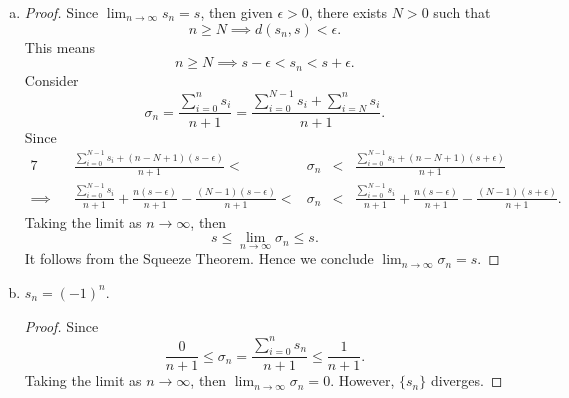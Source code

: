 \begin{Exercise}
\begin{enumerate}[(a)]
\item
\begin{proof}
Since $\lim_{n\to\infty} s_n = s$, then given $\epsilon>0$, there exists $N>0$ such that
$$
n\geq N \implies d(s_n,s) < \epsilon.
$$
This means
$$
n\geq N \implies s-\epsilon < s_n < s+\epsilon.
$$
Consider
$$
\sigma_n = \frac{\sum_{i=0}^{n} s_i}{n+1} = \frac{\sum_{i=0}^{N-1} s_i + \sum_{i=N}^{n} s_i}{n+1}.
$$
Since
\begin{alignat*}{7}
\quad&& \frac{\sum_{i=0}^{N-1}s_i + (n-N+1)(s-\epsilon)}{n+1} <& \sigma_n &<& \frac{\sum_{i=0}^{N-1}s_i + (n-N+1)(s+\epsilon)}{n+1} \\
\implies&& \frac{\sum_{i=0}^{N-1}s_i}{n+1}+\frac{n(s-\epsilon)}{n+1}-\frac{(N-1)(s-\epsilon)}{n+1} <& \sigma_n &<& \frac{\sum_{i=0}^{N-1}s_i}{n+1}+\frac{n(s-\epsilon)}{n+1}-\frac{(N-1)(s+\epsilon)}{n+1}.
\end{alignat*}
Taking the limit as $n\to\infty$, then
$$
s \leq \lim_{n\to\infty} \sigma_n \leq s.
$$
It follows from the Squeeze Theorem. Hence we conclude $\lim_{n\to\infty} \sigma_n = s$.
\end{proof}

\item
\begin{answer}
$s_n = (-1)^n$.
\end{answer}
\begin{proof}
Since 
$$
\frac{0}{n+1} \leq \sigma_n = \frac{\sum_{i=0}^{n} s_n}{n+1} \leq \frac{1}{n+1}.
$$
Taking the limit as $n\to\infty$, then $\lim_{n\to\infty} \sigma_n = 0$. However, $\{s_n\}$ diverges.
\end{proof}


\end{enumerate}
\end{Exercise}
